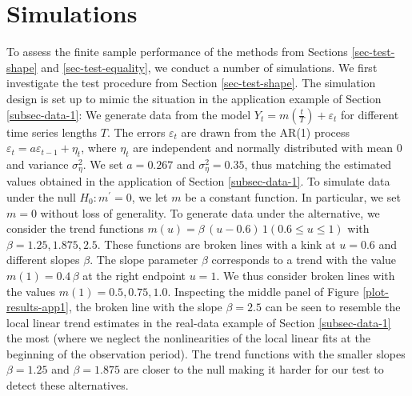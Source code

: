 
\section{Simulations}\label{sec-sim}


To assess the finite sample performance of the methods from Sections \ref{sec-test-shape} and \ref{sec-test-equality}, we conduct a number of simulations. We first investigate the test procedure from Section \ref{sec-test-shape}. The simulation design is set up to mimic the situation in the application example of Section \ref{subsec-data-1}: We generate data from the model $Y_t = m(\frac{t}{T}) + \varepsilon_t$ for different time series lengths $T$. The errors $\varepsilon_t$ are drawn from the AR(1) process $\varepsilon_t = a \varepsilon_{t-1} + \eta_t$, where $\eta_t$ are independent and normally distributed with mean $0$ and variance $\sigma_\eta^2$. We set $a = 0.267$ and $\sigma_\eta^2 = 0.35$, thus matching the estimated values obtained in the application of Section \ref{subsec-data-1}. To simulate data under the null $H_0: m^\prime = 0$, we let $m$ be a constant function. In particular, we set $m = 0$ without loss of generality. To generate data under the alternative, we consider the trend functions $m(u) = \beta \, (u - 0.6) \, 1(0.6 \le u \le 1)$ with $\beta = 1.25, 1.875, 2.5$. These functions are broken lines with a kink at $u = 0.6$ and different slopes $\beta$. The slope parameter $\beta$ corresponds to a trend with the value $m(1) = 0.4 \, \beta$ at the right endpoint $u = 1$. We thus consider broken lines with the values $m(1) = 0.5, 0.75, 1.0$. Inspecting the middle panel of Figure \ref{plot-results-app1}, the broken line with the slope $\beta = 2.5$ can be seen to resemble the local linear trend estimates in the real-data example of Section \ref{subsec-data-1} the most (where we neglect the nonlinearities of the local linear fits at the beginning of the observation period). The trend functions with the smaller slopes $\beta = 1.25$ and $\beta = 1.875$ are closer to the null making it harder for our test to detect these alternatives.


